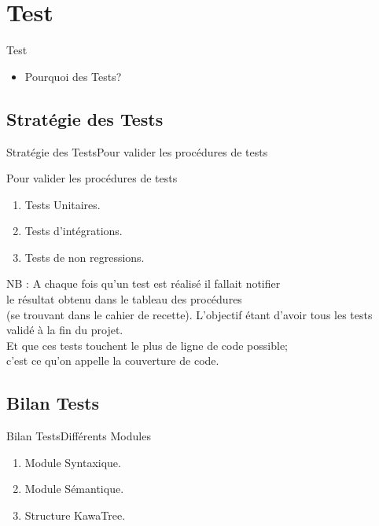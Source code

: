 \section{Test}
    \begin{frame}{Test}    	
		\begin{itemize}
			\item Pourquoi des Tests?
		\end{itemize}
	
    \end{frame}

    \subsection{Stratégie des Tests}
	\begin{frame}{Stratégie des Tests}{Pour valider les procédures de tests}
		\begin{block}{Pour valider les procédures de tests}
			\begin{enumerate}
				\item<1-> Tests Unitaires.
				\item<2-> Tests d'intégrations.
				\item<3-> Tests de non regressions.
			\end{enumerate} 
			\pause
			\pause
			\pause
			
		\end{block}
		\begin{block}{NB :} %
			A chaque fois qu’un test est réalisé il fallait notifier\\
		    le résultat obtenu dans le tableau des procédures\\
           (se trouvant dans le cahier de recette).
            L’objectif étant d’avoir tous les tests validé à la fin du projet.\\
         	Et que ces tests touchent le plus de ligne de code possible; \\
        	 c’est ce qu’on appelle la couverture de code. 
		\end{block}
	\end{frame}

	\subsection{Bilan Tests}
		\begin{frame}{Bilan Tests}{Différents Modules}
			\begin{enumerate}
				\item<1-> Module Syntaxique.
				\item<2-> Module Sémantique.
				\item<3-> Structure KawaTree.
			\end{enumerate} 		
		\end{frame}

